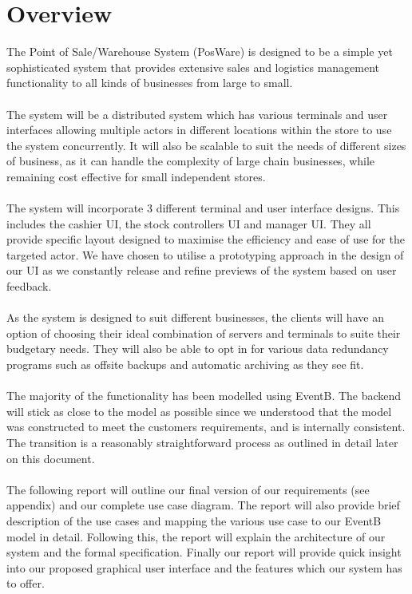 \documentclass[a4paper]{article}
\begin{document}
\tableofcontents
\pagebreak


\setcounter{page}{1}     %
\renewcommand{\thepage}{\arabic{page}}  %


\section{Overview}
The Point of Sale/Warehouse System (PosWare) is designed to be a simple yet sophisticated system that provides extensive sales and logistics management functionality to all kinds of businesses from large to small. 
\\\\
The system will be a distributed system which has various terminals and user interfaces allowing multiple actors in different locations within the store to use the system concurrently. It will also be scalable to suit the needs of different sizes of business, as it can handle the complexity of large chain businesses, while remaining cost effective for small independent stores.
\\\\
The system will incorporate 3 different terminal and user interface designs. This includes the cashier UI, the stock controllers UI and manager UI. They all provide specific layout designed to maximise the efficiency and ease of use for the targeted actor. We have chosen to utilise a prototyping approach in the design of our UI as we constantly release and refine previews of the system based on user feedback. 
\\\\
As the system is designed to suit different businesses, the clients will have an option of choosing their ideal combination of servers and terminals to suite their budgetary needs. They will also be able to opt in for various data redundancy programs such as offsite backups and automatic archiving as they see fit.
\\\\
The majority of the functionality has been modelled using EventB. The backend will stick as close to the model as possible since we understood that the model was constructed to meet the customers requirements, and is internally consistent. The transition is a reasonably straightforward process as outlined in detail later on this document.
\\\\
The following report will outline our final version of our requirements (see appendix) and our complete use case diagram. The report will also provide brief description of the use cases and mapping the various use case to our EventB model in detail. Following this, the report will explain the architecture of our system and the formal specification. Finally our report will provide quick insight into our proposed graphical user interface and the features which our system has to offer.
\pagebreak
\end{document}
